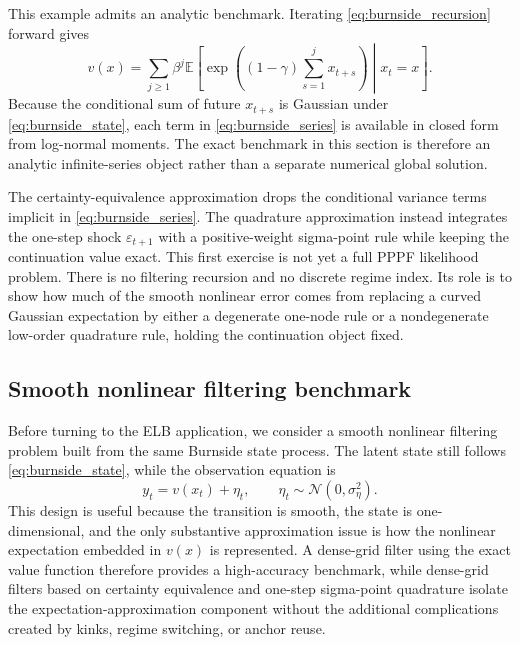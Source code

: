 \documentclass[11pt]{article}
\theoremstyle{remark}
\newcommand{\E}{\mathbb{E}}
\begin{document}
This example admits an analytic benchmark.
Iterating \eqref{eq:burnside_recursion} forward gives
\begin{equation}
v(x)=\sum_{j\ge 1}\beta^j \E\!\left[\exp\!\left((1-\gamma)\sum_{s=1}^j x_{t+s}\right)\middle| x_t=x\right].
\label{eq:burnside_series}
\end{equation}
Because the conditional sum of future $x_{t+s}$ is Gaussian under \eqref{eq:burnside_state}, each term in \eqref{eq:burnside_series} is available in closed form from log-normal moments.
The exact benchmark in this section is therefore an analytic infinite-series object rather than a separate numerical global solution.

The certainty-equivalence approximation drops the conditional variance terms implicit in \eqref{eq:burnside_series}.
The quadrature approximation instead integrates the one-step shock $\varepsilon_{t+1}$ with a positive-weight sigma-point rule while keeping the continuation value exact.
This first exercise is not yet a full PPPF likelihood problem.
There is no filtering recursion and no discrete regime index.
Its role is to show how much of the smooth nonlinear error comes from replacing a curved Gaussian expectation by either a degenerate one-node rule or a nondegenerate low-order quadrature rule, holding the continuation object fixed.

\subsection{Smooth nonlinear filtering benchmark}

Before turning to the ELB application, we consider a smooth nonlinear filtering problem built from the same Burnside state process.
The latent state still follows \eqref{eq:burnside_state}, while the observation equation is
\begin{equation}
y_t=v(x_t)+\eta_t,
\qquad
\eta_t\sim\mathcal{N}(0,\sigma_\eta^2).
\label{eq:burnside_measurement}
\end{equation}
This design is useful because the transition is smooth, the state is one-dimensional, and the only substantive approximation issue is how the nonlinear expectation embedded in $v(x)$ is represented.
A dense-grid filter using the exact value function therefore provides a high-accuracy benchmark, while dense-grid filters based on certainty equivalence and one-step sigma-point quadrature isolate the expectation-approximation component without the additional complications created by kinks, regime switching, or anchor reuse.
\end{document}
